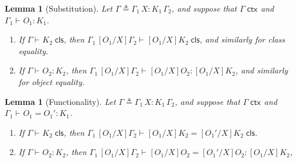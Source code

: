 \documentclass[11pt,twoside]{article}
\newtheorem{lemma}[theorem]{Lemma}
\newcommand{\subst}[3]{[{#1}/{#2}]{#3}}
\newcommand{\eqdef}{\mathrel{\triangleq}}
\newcommand{\isdef}{\eqdef}
\newcommand{\appctx}[2]{{#1}\,{#2}}
\newcommand{\isctx}[2][]{{#2}\;\mathsf{ctx}_{#1}}
\newcommand{\iscls}[3][]{{#2}\vdash_{#1}{#3}\;\mathsf{cls}}
\newcommand{\eqcls}[4][]{{#2}\vdash_{#1}{#3}={#4}\;\mathsf{cls}}
\newcommand{\isobj}[4][]{{#2}\vdash_{#1}{#3}:{#4}}
\newcommand{\eqobj}[5][]{{#2}\vdash_{#1}{#3}={#4}:{#5}}
\begin{document}
\begin{lemma}[Substitution]
  \label{lemma:subst}
  Let $\Gamma\isdef{}\appctx{\appctx{\Gamma_{1}}{X{:}K_{1}}}{\Gamma_{2}}$, and suppose that
  $\isctx{\Gamma}$ and $\isobj{\Gamma_{1}}{O_{1}}{K_{1}}$.
  \begin{enumerate}
  \item If\/ $\iscls{\Gamma}{K_{2}}$, then
    $\iscls{\appctx{\Gamma_1}{\subst{O_1}{X}{\Gamma_2}}}{\subst{O_{1}}{X}{K_{2}}}$, and similarly for class equality.
  \item If\/ $\isobj{\Gamma}{O_{2}}{K_{2}}$, then
    $\isobj{\appctx{\Gamma_1}{\subst{O_1}{X}{\Gamma_2}}}{\subst{O_{1}}{X}{O_{2}}}{\subst{O_{1}}{X}{K_{2}}}$,
    and similarly for object equality.
  \end{enumerate}
\end{lemma}

\begin{lemma}[Functionality]
  \label{lemma:func}
    Let $\Gamma\isdef{}\appctx{\appctx{\Gamma_{1}}{X{:}K_{1}}}{\Gamma_{2}}$, and suppose that
    $\isctx{\Gamma}$ and $\eqobj{\Gamma_{1}}{O_{1}}{O_{1}'}{K_{1}}$.
  \begin{enumerate}
  \item If\/ $\iscls{\Gamma}{K_{2}}$, then
    $\eqcls{\appctx{\Gamma_1}{\subst{O_1}{X}{\Gamma_2}}}{\subst{O_{1}}{X}{K_{2}}}{\subst{O_{1}'}{X}{K_{2}}}$.
  \item If\/ $\isobj{\Gamma}{O_{2}}{K_{2}}$, then
    $\eqobj{\appctx{\Gamma_1}{\subst{O_1}{X}{\Gamma_2}}}{\subst{O_{1}}{X}{O_{2}}}{\subst{O_{1}'}{X}{O_{2}}}{\subst{O_{1}}{X}{K_{2}}}$,
  \end{enumerate}
\end{lemma}
\end{document}
